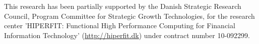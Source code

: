 \documentclass{sigplanconf}  %
\begin{document}

\acks
This research has been partially supported by the Danish
Strategic Research Council, Program Committee for Strategic Growth
Technologies, for the research center 'HIPERFIT: Functional High
Performance Computing for Financial Information Technology'
(\url{http://hiperfit.dk}) under contract number 10-092299.




\softraggedright

\end{document}
